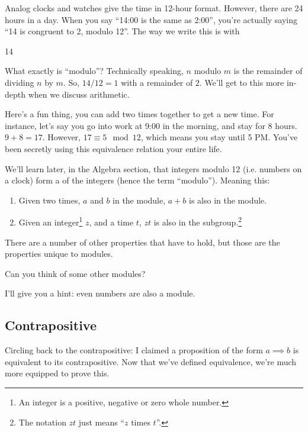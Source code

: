 \begin{example}
  Analog clocks and watches give the time in 12-hour format. However,
  there are 24 hours in a day. When you say ``14:00 is the same as
  2:00'', you're actually saying ``14 is congruent to 2, modulo
  12''. The way we write this is with

  \begin{zz}
    14  
  \end{zz}

  What exactly is ``modulo''? Technically speaking, $n$ modulo $m$ is
  the remainder of dividing $n$ by $m$. So, $14 / 12 = 1$ with a
  remainder of $2$. We'll get to this more in-depth when we discuss
  arithmetic.

  Here's a fun thing, you can add two times together to get a new
  time. For instance, let's say you go into work at 9:00 in the
  morning, and stay for 8 hours. $9 + 8 = 17$. However,
  $17 \equiv 5 \mod 12$, which means you stay until 5 PM. You've been
  secretly using this equivalence relation your entire life.

  We'll learn later, in the Algebra section, that integers modulo 12
  (i.e. numbers on a clock) form a  of the integers
  (hence the term ``modulo''). Meaning this:

  \begin{enumerate}
  \item Given two times, $a$ and $b$ in the module, $a + b$ is also in
    the module.
  \item Given an integer\footnote{An integer is a positive, negative
      or zero whole number.} $z$, and a time $t$, $zt$ is also in the
    subgroup.\footnote{The notation $zt$ just means ``$z$ times
      $t$''.}
  \end{enumerate}

  There are a number of other properties that have to hold, but those
  are the properties unique to modules.

  Can you think of some other modules?

  I'll give you a hint: even numbers are also a module.
\end{example}

\subsection{Contrapositive}

Circling back to the contrapositive: I claimed a proposition of the
form $a \implies b$ is equivalent to its contrapositive. Now that
we've defined equivalence, we're much more equipped to prove this.

